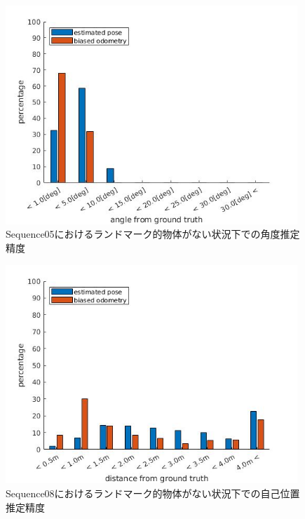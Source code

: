 \begin{figure}[htbp]
 \begin{minipage}{1.0\hsize}
  \begin{center}
   \includegraphics[width=110mm]{./picture/no_car_s5_rpy.jpg}
  \end{center}
  \caption{Sequence05におけるランドマーク的物体がない状況下での角度推定精度}
  \label{fig:no_car_s5_rpy}
 \end{minipage}
\end{figure}

\begin{figure}[htbp]
 \begin{minipage}{1.0\hsize}
  \begin{center}
   \includegraphics[width=110mm]{./picture/no_car_s8_xyz.jpg}
  \end{center}
  \caption{Sequence08におけるランドマーク的物体がない状況下での自己位置推定精度}
  \label{fig:no_car_s8_xyz}
 \end{minipage}
\end{figure}

